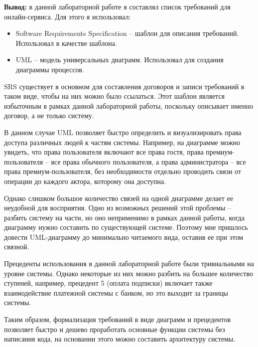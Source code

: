\bigskip

\textbf{Вывод:} в данной лабораторной работе я составлял список требований для онлайн-сервиса.
Для этого я использовал:
\begin{itemize}
    \item Software Requirements Specification -- шаблон для описания требований.
    Использовал в качестве шаблона.
    \item UML -- модель универсальных диаграмм.
    Использовал для создания диаграммы процессов.
\end{itemize}

SRS существует в основном для составления договоров и записи требований в таком виде,
чтобы на них можно было ссылаться.
Этот шаблон является избыточным в рамках данной лабораторной работы,
поскольку описывает именно договор, а не только систему.

В данном случае UML позволяет быстро определить и визуализировать права доступа различных людей
к частям системы.
Например, на диаграмме можно увидеть, что права пользователя включают все права гостя,
права премиум-пользователя -- все права обычного пользователя,
а права администратора -- все права премиум-пользователя,
без необходимости отдельно проводить связи от операции до каждого актора,
которому она доступна.

Однако слишком большое количество связей на одной диаграмме делает ее неудобной для восприятия.
Одно из возможных решений этой проблемы -- разбить систему на части,
но оно неприменимо в рамках данной работы,
когда диаграмму нужно составить по существующей системе.
Поэтому мне пришлось довести UML-диаграмму до минимально читаемого вида,
оставив ее при этом связной.

Прецеденты использования в данной лабораторной работе были тривиальными на уровне системы.
Однако некоторые из них можно разбить на большее количество ступеней,
например, прецедент 5 (оплата подписки) включает также взаимодействие платежной системы с банком,
но это выходит за границы системы.

Таким образом, формализация требований в виде диаграмм и прецедентов позволяет быстро и дешево
проработать основные функции системы без написания кода,
на основании этого можно составить архитектуру системы.

